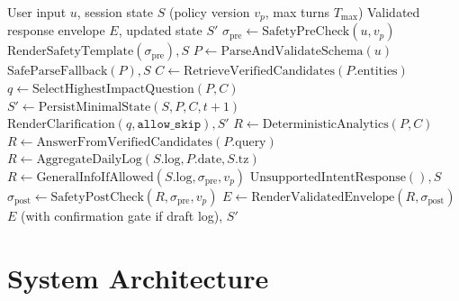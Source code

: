 \documentclass[conference]{IEEEtran}
\begin{document}
\begin{algorithm}[t]
\caption{Non-Blocking Multi-Intent Request Handling}
\label{alg:agent}
\begin{algorithmic}[1]
\Require User input $u$, session state $S$ (policy version $v_p$, max turns $T_{\max}$)
\Ensure Validated response envelope $E$, updated state $S'$
\State $\sigma_{\text{pre}} \gets \text{SafetyPreCheck}(u, v_p)$
    \State \Return $\text{RenderSafetyTemplate}(\sigma_{\text{pre}}), S$
\EndIf
\State $P \gets \text{ParseAndValidateSchema}(u)$
    \State \Return $\text{SafeParseFallback}(P), S$
\EndIf
{}
    \State $C \gets \text{RetrieveVerifiedCandidates}(P.\text{entities})$
        \State $q \gets \text{SelectHighestImpactQuestion}(P, C)$
        \State $S' \gets \text{PersistMinimalState}(S, P, C, t{+}1)$
        \State \Return $\text{RenderClarification}(q, \texttt{allow\_skip}), S'$
    \EndIf
    \State $R \gets \text{DeterministicAnalytics}(P, C)$ 
    \State $R \gets \text{AnswerFromVerifiedCandidates}(P.\text{query})$
    \State $R \gets \text{AggregateDailyLog}(S.\text{log}, P.\text{date}, S.\text{tz})$
    \State $R \gets \text{GeneralInfoIfAllowed}(S.\text{log}, \sigma_{\text{pre}}, v_p)$
\Else
    \State \Return $\text{UnsupportedIntentResponse}(), S$
\EndIf
\State $\sigma_{\text{post}} \gets \text{SafetyPostCheck}(R, \sigma_{\text{pre}}, v_p)$
\State $E \gets \text{RenderValidatedEnvelope}(R, \sigma_{\text{post}})$
\State \Return $E$ (with confirmation gate if draft log), $S'$
\end{algorithmic}
\end{algorithm}

\section{System Architecture}
\end{document}
